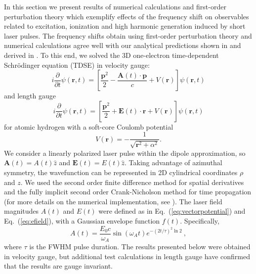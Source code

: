 In this section we present results of numerical calculations and first-order perturbation theory which exemplify effects of the frequency shift on observables related to excitation, ionization and high harmonic generation induced by short laser pulses. The frequency shifts obtain using first-order perturbation theory and numerical calculations agree well with our analytical predictions shown in 
and derived in
. To this end, we solved the 3D one-electron time-dependent Schr\"odinger equation (TDSE) in velocity gauge:
\begin{equation}
i\frac{\partial}{\partial t}\psi(\mathbf{r},t) = \left[\frac{\mathbf{p}^2}{2} - \frac{\mathbf{A}(t) \cdot \mathbf{p}}{c} + V(\mathbf{r})\right]\psi(\mathbf{r},t)
\end{equation}
and length gauge
\begin{equation}
i\frac{\partial}{\partial t}\psi(\mathbf{r},t) = \left[\frac{\mathbf{p}^2}{2} + \mathbf{E}(t) \cdot \mathbf{\mathbf{r}} + V(\mathbf{r})\right]\psi(\mathbf{r},t)
\end{equation}
for atomic hydrogen with a soft-core Coulomb potential
\begin{equation}
V(\mathbf{r}) = -\frac{1}{\sqrt{\mathbf{r}^2+\alpha ^2}}.
\end{equation}
We consider a linearly polarized laser pulse within the dipole approximation, so $\mathbf{A}(t)=A(t)\hat{z}$ and $\mathbf{E}(t)=E(t)\hat{z}$. Taking advantage of azimuthal symmetry, the wavefunction can be represented in 2D cylindrical coordinates $\rho$ and $z$. We used the second order finite difference method for spatial derivatives and the fully implicit second order Crank-Nicholson method for time propagation (for more details on the numerical implementation, see \cite{venzke2020_ionization}). The laser field magnitudes $A(t)$ and $E(t)$ were defined as in Eq.~(\ref{eq:vectorpotential}) and Eq.~(\ref{eq:efield}), with a Gaussian envelope function $f(t)$.
Specifically,
\begin{equation}
\label{eq:numericalVecPot}
A(t) = \frac{E_0c}{\omega_A}\sin(\omega_A t)e^{-(2t/\tau)^2\ln 2} ~,
\end{equation}
where $\tau$ is the FWHM pulse duration. The results presented below were obtained in velocity gauge, but additional test calculations in length gauge have confirmed that the results are gauge invariant.

